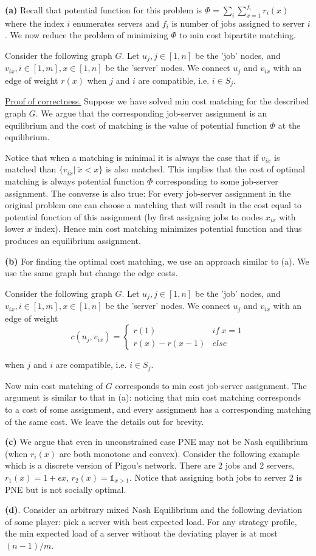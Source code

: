 \textbf{(a)} Recall that potential function for this problem is $\Phi = \sum_i \sum_{x=1}^{f_i}r_i(x)$ where the index $i$ enumerates servers and $f_i$ is number of jobs assigned to server $i$. We now reduce the problem of minimizing $\Phi$ to min cost bipartite matching.

Consider the following graph $G$. Let $u_j,j\in[1,n]$ be the 'job' nodes, and $v_{ix},i\in[1,m],x\in[1,n]$ be the 'server' nodes. We connect $u_j$ and $v_{ix}$ with an edge of weight $r(x)$ when $j$ and $i$ are compatible, i.e. $i\in S_j$. 

\uline{Proof of correctness.} Suppose we have solved min cost matching for the described graph $G$. We argue that the corresponding job-server assignment is an equilibrium and the cost of matching is the value of potential function $\Phi$ at the equilibrium.  

Notice that when a matching is minimal it is always the case that if $v_{ix}$ is matched than $\{v_{i\tilde x}|\ \tilde x<x\}$ is also matched. This implies that the cost of optimal matching is always potential function $\Phi$ corresponding to some job-server assignment. The converse is also true: For every job-server assignment in the original problem one can choose a matching that will result in the cost equal to potential function of this assignment (by first assigning jobs to nodes $x_{ix}$ with lower $x$ index). Hence min cost matching minimizes potential function and thus produces an equilibrium assignment.

\textbf{(b)} For finding the optimal cost matching, we use an approach similar to (a). We use the same graph but change the edge costs.

Consider the following graph $G$. Let $u_j,j\in[1,n]$ be the 'job' nodes, and $v_{ix},i\in[1,m],x\in[1,n]$ be the 'server' nodes. We connect $u_j$ and $v_{ix}$ with an edge of weight $$ c(u_j,v_{ix})=\begin{cases} r(1)\qquad &if\ x=1 \\ r(x)-r(x-1) &else \end{cases}$$ 


when $j$ and $i$ are compatible, i.e. $i\in S_j$. 

Now min cost matching of $G$ corresponds to min cost job-server assignment. The argument is similar to that in (a): noticing that min cost matching corresponds to a cost of some assignment, and every assignment has a corresponding matching of the same cost. We leave the details out for brevity.

\textbf{(c)} We argue that even in unconstrained case PNE may not be Nash equilibrium (when $r_i(x)$ are both monotone and convex). Consider the following example which is a discrete version of Pigou's network. There are 2 jobs and 2 servers, $r_1(x)=1+\epsilon x$, $r_2(x) = \mathbb{1}_{x>1}$. Notice that assigning both jobs to server $2$ is PNE but is not socially optimal. 

\textbf{(d)}. Consider an arbitrary mixed Nash Equilibrium and the following deviation of some player: pick a server with best expected load. For any strategy profile, the min expected load of a server without the deviating player is at most $(n-1)/m$. 